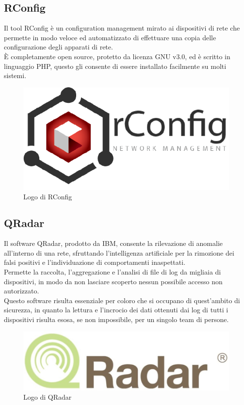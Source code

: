 \documentclass[Tesi.tex]{subfiles}
\begin{document}
\subsection{RConfig}
Il tool RConfig è un configuration management mirato ai dispositivi di rete che permette in modo veloce ed automatizzato di effettuare una copia delle configurazione degli apparati di rete. \\
\`{E} completamente open source, protetto da licenza GNU v3.0, ed è scritto in linguaggio PHP, questo gli consente di essere installato facilmente su molti sistemi.
\begin{figure}[H]
	\centering
	\includegraphics[width=0.5\linewidth]{"images/logo/rConfig_logo"}
	\caption{Logo di RConfig}
	\label{fig:Logo di RConfig}
\end{figure}

\subsection{QRadar}
Il software QRadar, prodotto da IBM, consente la rilevazione di anomalie all'interno di una rete, sfruttando l'intelligenza artificiale per la rimozione dei falsi positivi e l'individuazione di comportamenti inaspettati.\\
Permette la raccolta, l'aggregazione e l'analisi di file di log da migliaia di dispositivi, in modo da non lasciare scoperto nessun possibile accesso non autorizzato. \\
Questo software risulta essenziale per coloro che si occupano di quest'ambito di sicurezza, in quanto la lettura e l'incrocio dei dati ottenuti dai log di tutti i dispositivi risulta esosa, se non impossibile, per un singolo team di persone.
\begin{figure}[H]
	\centering
	\includegraphics[width=0.5\linewidth]{"images/logo/QRadar_logo"}
	\caption{Logo di QRadar}
	\label{fig:Logo di QRadar}
\end{figure}
\end{document}
